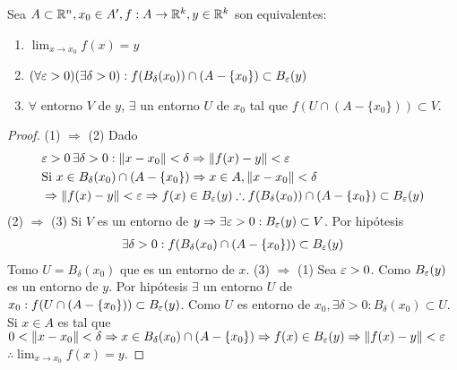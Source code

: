 \begin{prop}
  Sea \(A \subset \mathbb{R}^n, x_0 \in A^{\prime}, f: A \to \mathbb{R}^k, y \in \mathbb{R}^k\) son equivalentes:
  \begin{enumerate}
    \item \(\lim_{x \to x_0} f(x) = y\)
    \item \((\forall \varepsilon > 0)(\exists \delta > 0) : f(B_{\delta}(x_0)) \cap (A - \{x_0\}) \subset B_{\varepsilon}(y)\)
    \item \(\forall \) entorno \(V\) de \(y\), \(\exists \) un entorno \(U\) de \(x_0\) tal que \(f(U \cap (A - \{x_0\})) \subset V\).
  \end{enumerate}

  \begin{proof}
    (1) \(\Rightarrow \) (2) Dado \begin{align*}
       & \varepsilon > 0 \, \exists \delta > 0 : \|x - x_0 \| < \delta \Rightarrow \|f(x) - y\| < \varepsilon                                              \\
       & \text{Si } x \in B_{\delta}(x_0) \cap (A - \{x_0\}) \Rightarrow x \in A, \|x - x_0\| < \delta                                   \\
       & \Rightarrow \|f(x) - y\| < \varepsilon \Rightarrow f(x) \in B_{\varepsilon}(y) \therefore f(B_{\delta}(x_0)) \cap (A - \{x_0\}) \subset B_{\varepsilon}(y)
    \end{align*}
    (2) \(\Rightarrow \) (3) Si \(V\) es un entorno de \(y \Rightarrow \exists \varepsilon > 0 : B_{\varepsilon}(y) \subset V\). Por hipótesis \begin{align*}
      \exists \delta > 0 : f(B_{\delta}(x_0) \cap (A - \{x_0\})) \subset B_{\varepsilon}(y)
    \end{align*} Tomo \(U = B_{\delta}(x_0)\) que es un entorno de \(x\).
    (3) \(\Rightarrow \) (1) Sea \(\varepsilon > 0\). Como \(B_{\varepsilon}(y)\) es un entorno de \(y\). Por hipótesis \(\exists \) un entorno \(U\) de \(x_0 : f(U \cap (A - \{x_0\})) \subset B_{\varepsilon}(y)\). Como \(U\) es entorno de \(x_0, \exists \delta > 0 : B_{\delta}(x_0) \subset U\). \\
    Si \(x \in A\) es tal que \(0 < \|x - x_0\| < \delta \Rightarrow x \in B_{\delta}(x_0) \cap (A - \{x_0\}) \Rightarrow f(x) \in B_{\varepsilon}(y) \Rightarrow \|f(x) - y\| < \varepsilon \) \\
    \(\therefore \lim_{x \to x_0} f(x) = y\).
  \end{proof}
\end{prop}

